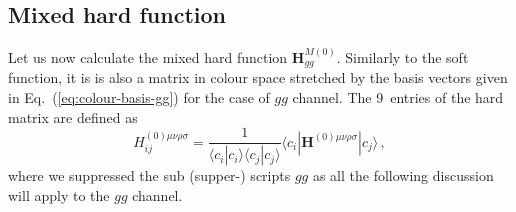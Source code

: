 \documentclass[a4paper,11pt]{report}
\numberwithin{equation}{section}
\begin{document}
\subsection{Mixed hard function}

Let us now calculate the mixed hard function $\bm{H}^{M(0)}_{gg} $.
%
Similarly to the soft function, it is is also a matrix in colour space stretched
by the basis vectors given in Eq.~(\ref{eq:colour-basis-gg}) for the case of
$gg$ channel. The 9~entries of the hard matrix are defined as
%
\begin{equation}
  H^{(0) \mu\nu\rho\sigma}_{ij} = 
  \frac{1}{\langle c_i | c_i \rangle \langle c_j | c_j \rangle}
  \langle c_i | \bm{H}^{(0) \mu\nu\rho\sigma}| c_j \rangle\,,
\end{equation}
%
where we suppressed the sub (supper-) scripts $gg$ as all the following
discussion will apply to the $gg$ channel.
\end{document}
